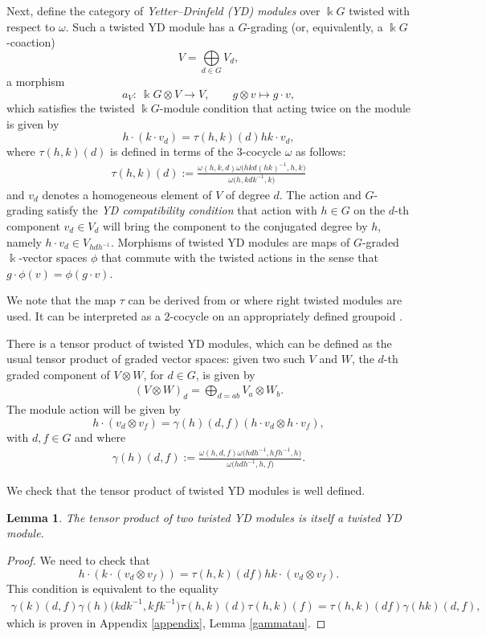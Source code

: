 \documentclass[10pt,a4paper]{amsart}
\numberwithin{equation}{section}
\newtheorem{Lemma}[Theorem]{Lemma}
\begin{document}
Next, define the category of \emph{Yetter--Drinfeld (YD) modules} over $\Bbbk G$ twisted with respect to $\omega$. Such a twisted YD module has a $G$-grading (or, equivalently, a $\Bbbk G$-coaction)
\[V=\bigoplus\limits_{d \in G} V_d,\]
 a morphism
 \[a_V\colon\ \Bbbk G\otimes V\to V, \qquad g\otimes v\mapsto g\cdot v,\]
 which satisfies the twisted $\Bbbk G$-module condition that acting twice on the module is given by
\[
 h \cdot ( k \cdot v_d )=\tau (h,k)(d) hk \cdot v_d,
\]
where $\tau (h,k)(d)$ is defined in terms of the $3$-cocycle $\omega$ as follows:
\begin{align}\label{eq-taudef}
 \tau (h,k)(d):=\frac{\omega(h,k,d) \omega \big(hkd(hk)^{-1},h,k\big)}{\omega\big(h,kdk^{-1},k\big)}
\end{align}
and $v_d$ denotes a homogeneous element of $V$ of degree $d$.
The action and $G$-grading satisfy the \emph{YD compatibility condition} that action with $h \in G$ on the $d$-th component $v_d \in V_d$ will bring the component to the conjugated degree by $h$, namely $h \cdot v_d \in V_{h d h^{-1}}$. Morphisms of twisted YD modules are maps of $G$-graded $\Bbbk$-vector spaces $\phi$ that commute with the twisted actions in the sense that
$g\cdot \phi(v)=\phi(g\cdot v)$.


We note that the map $\tau$ can be derived from \cite[Section~1.3.3]{Wil} or \cite[Proposition 3.2]{Maj98} where right twisted modules are used. It can be interpreted as a $2$-cocycle on an appropriately defined groupoid \cite{Wil}.

There is a tensor product of twisted YD modules, which can be defined as the usual tensor product of graded vector spaces: given two such $V$ and $W$, the $d$-th graded component of $V\otimes W$, for $d\in G$, is given by
\begin{align*}
( V \otimes W )_d=\bigoplus\limits_{d=ab} V_a \otimes W_b.
\end{align*}
The module action will be given by
\[
h \cdot (v_d \otimes v_f )=\gamma(h)(d,f) (h \cdot v_d \otimes h \cdot v_f),
\]
with $d,f \in G$ and where
\begin{align}\label{eq-gammadef}
 \gamma (h)(d,f):=\frac{\omega(h,d,f) \omega\big(hdh^{-1},hfh^{-1},h\big)}{\omega\big(hdh^{-1},h,f\big)}.
\end{align}

We check that the tensor product of twisted YD modules is well defined.

 \begin{Lemma}
 The tensor product of two twisted YD modules is itself a twisted YD module.
 \end{Lemma}
 \begin{proof}
We need to check that
\[h \cdot ( k \cdot ( v_d \otimes v_f ) )=\tau (h,k ) ( df ) hk \cdot ( v_d \otimes v_f ).\]
This condition is equivalent to the equality
 \begin{align*}
 \gamma ( k ) ( d,f ) \gamma ( h ) \big( kdk^{-1},kfk^{-1} \big) \tau ( h,k ) ( d ) \tau ( h,k ) ( f ) =\tau ( h,k ) ( df ) \gamma ( hk ) ( d,f ),
 \end{align*}
 which is proven in Appendix \ref{appendix}, Lemma \ref{gammatau}.
 \end{proof}
\end{document}
